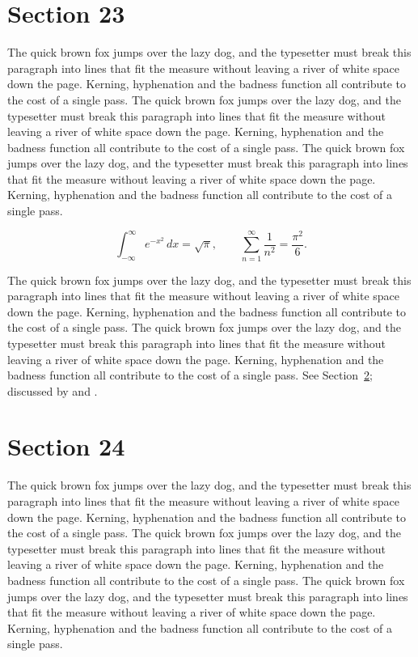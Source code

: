 \documentclass{article}
\begin{document}
\section{Section 23}
\label{sec:23}
The quick brown fox jumps over the lazy dog, and the typesetter must break this paragraph into lines that fit the measure without leaving a river of white space down the page. Kerning, hyphenation and the badness function all contribute to the cost of a single pass. The quick brown fox jumps over the lazy dog, and the typesetter must break this paragraph into lines that fit the measure without leaving a river of white space down the page. Kerning, hyphenation and the badness function all contribute to the cost of a single pass. The quick brown fox jumps over the lazy dog, and the typesetter must break this paragraph into lines that fit the measure without leaving a river of white space down the page. Kerning, hyphenation and the badness function all contribute to the cost of a single pass. 

\begin{equation}\label{eq:23}
\int_{-\infty}^{\infty} e^{-x^{2}}\,dx = \sqrt{\pi}, \qquad
\sum_{n=1}^{\infty} \frac{1}{n^{2}} = \frac{\pi^{2}}{6}.
\end{equation}

The quick brown fox jumps over the lazy dog, and the typesetter must break this paragraph into lines that fit the measure without leaving a river of white space down the page. Kerning, hyphenation and the badness function all contribute to the cost of a single pass. The quick brown fox jumps over the lazy dog, and the typesetter must break this paragraph into lines that fit the measure without leaving a river of white space down the page. Kerning, hyphenation and the badness function all contribute to the cost of a single pass. 
See Section~\ref{sec:24}; discussed by \textcite{k4} and \textcite{l1}.
\section{Section 24}
\label{sec:24}
The quick brown fox jumps over the lazy dog, and the typesetter must break this paragraph into lines that fit the measure without leaving a river of white space down the page. Kerning, hyphenation and the badness function all contribute to the cost of a single pass. The quick brown fox jumps over the lazy dog, and the typesetter must break this paragraph into lines that fit the measure without leaving a river of white space down the page. Kerning, hyphenation and the badness function all contribute to the cost of a single pass. The quick brown fox jumps over the lazy dog, and the typesetter must break this paragraph into lines that fit the measure without leaving a river of white space down the page. Kerning, hyphenation and the badness function all contribute to the cost of a single pass. 
\end{document}
